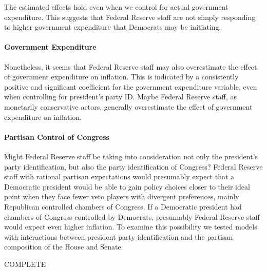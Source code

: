 \documentclass[a4paper]{article}\usepackage{graphicx, color}
\begin{document}
The estimated effects hold even when we control for actual government expenditure. This suggests that Federal Reserve staff are not simply responding to higher government expenditure that Democrats may be initiating.

\paragraph{Government Expenditure}

Nonetheless, it seems that Federal Reserve staff may also overestimate the effect of government expenditure on inflation. This is indicated by a consistently positive and significant coefficient for the government expenditure variable, even when controlling for president's party ID. Maybe Federal Reserve staff, as monetarily conservative actors, generally overestimate the effect of government expenditure on inflation.  

\paragraph{Partisan Control of Congress}

Might Federal Reserve staff be taking into consideration not only the president's party identification, but also the party identification of Congress? Federal Reserve staff with rational partisan expectations would presumably expect that a Democratic president would be able to gain policy choices closer to their ideal point when they face fewer veto players with divergent preferences, mainly Republican controlled chambers of Congress. If a Democratic president had chambers of Congress controlled by Democrats, presumably Federal Reserve staff would expect even higher inflation. To examine this possibility we tested models with interactions between president party identification and the partisan composition of the House and Senate.

COMPLETE
\end{document}
